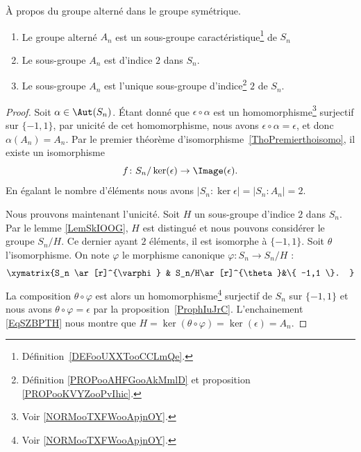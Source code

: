 \begin{proposition} \label{PROPooCPXOooVxPAij}
	À propos du groupe alterné dans le groupe symétrique.
	\begin{enumerate}
		\item
		      Le groupe alterné \( A_n\) est un sous-groupe caractéristique\footnote{Définition~\ref{DEFooUXXTooCCLmQe}.} de \( S_n\)
		\item   \label{ITEMooWXXUooOWvFgE}
		      Le sous-groupe \( A_n\) est d'indice \( 2\) dans \( S_n\).
		\item       \label{ITEMooGGAHooRYgNqq}
		      Le sous-groupe \( A_n\) est l'unique sous-groupe d'indice\footnote{Définition \ref{PROPooAHFGooAkMmlD} et proposition \ref{PROPooKVYZooPvIhic}.} \( 2\) de \( S_n\).
	\end{enumerate}
\end{proposition}

\begin{proof}
	Soit \( \alpha\in \Aut(S_n)\). Étant donné que \( \epsilon\circ\alpha\) est un homomorphisme\footnote{Voir \ref{NORMooTXFWooApjnOY}.} surjectif sur \( \{ -1,1 \}\), par unicité de cet homomorphisme, nous avons \( \epsilon\circ\alpha=\epsilon\), et donc \( \alpha(A_n)=A_n\). Par le premier théorème d'isomorphisme~\ref{ThoPremierthoisomo}, il existe un isomorphisme
	\begin{equation}
		f\colon S_n/\ker(\epsilon)\to \Image(\epsilon).
	\end{equation}
	En égalant le nombre d'éléments nous avons \( | S_n:\ker\epsilon |=| S_n:A_n |=2\).

	Nous prouvons maintenant l'unicité. Soit \( H\) un sous-groupe d'indice \( 2\) dans \( S_n\). Par le lemme \ref{LemSkIOOG}, \( H\) est distingué et nous pouvons considérer le groupe \( S_n/H\). Ce dernier ayant \( 2\) éléments, il est isomorphe à \( \{ -1,1 \}\). Soit \( \theta\) l'isomorphisme. On note \( \varphi\) le morphisme canonique \( \varphi\colon S_n\to S_n/H\) :
	\begin{equation}    \label{EqSZBPTH}
		\xymatrix{%
			S_n \ar[r]^{\varphi}        &   S_n/H\ar[r]^{\theta}&\{ -1,1 \}.
		}
	\end{equation}
	La composition \( \theta \circ \varphi\) est alors un homomorphisme\footnote{Voir \ref{NORMooTXFWooApjnOY}.} surjectif de \( S_n\) sur \( \{ -1,1 \}\) et nous avons \( \theta\circ\varphi=\epsilon\) par la proposition~\ref{ProphIuJrC}. L'enchainement \eqref{EqSZBPTH} nous montre que \( H=\ker(\theta\circ\varphi)=\ker(\epsilon)=A_n\).
\end{proof}

